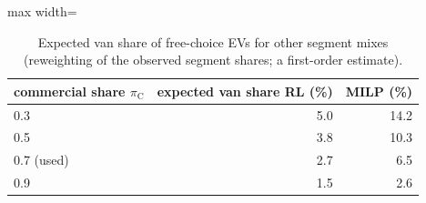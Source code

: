 \begin{table}[H]\centering
\caption{Expected van share of free-choice EVs for other segment mixes (reweighting of the observed segment shares; a first-order estimate).}\label{tab:mix}
\begin{adjustbox}{max width=\textwidth}\begin{tabular}{lrr}\toprule
commercial share $\pi_{\mathrm C}$ & expected van share RL (\%) & MILP (\%) \\ \midrule
0.3 & 5.0 & 14.2 \\
0.5 & 3.8 & 10.3 \\
0.7 (used) & 2.7 & 6.5 \\
0.9 & 1.5 & 2.6 \\
\bottomrule\end{tabular}\end{adjustbox}\end{table}
